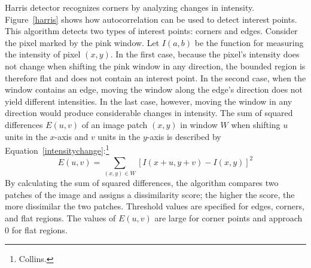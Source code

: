 \begin{figure}[!ht]
\vspace{-.1 in}
\end{figure}
Harris detector recognizes corners by analyzing changes in intensity. Figure~\ref{harris} shows how autocorrelation can be used to detect interest points. This algorithm detects two types of interest points: corners and edges. Consider the pixel marked by the pink window. Let $I(a, b)$ be the function for measuring the intensity of pixel $(x,y)$. In the first case, because the pixel's intensity does not change when shifting the pink window in any direction, the bounded region is therefore flat and does not contain an interest point. In the second case, when the window contains an edge, moving the window along the edge's direction does not yield different intensities. In the last case, however, moving the window in any direction would produce considerable changes in intensity. The sum of squared differences $E(u, v)$ of an image patch $(x, y)$ in window $W$ when shifting $u$ units in the $x$-axis and $v$ units in the $y$-axis is described by Equation~\ref{intensitychange}:\footnote{Collins.}
\begin{equation}\label{intensitychange}
E(u,v) = \sum\limits_{(x, y) \in W} [I(x + u, y + v) - I(x, y)]^2
\end{equation}
By calculating the sum of squared differences, the algorithm compares two patches of the image and assigns a dissimilarity score; the higher the score, the more dissimilar the two patches. Threshold values are specified for edges, corners, and flat regions. The values of $E(u,v)$ are large for corner points and approach $0$ for flat regions.

